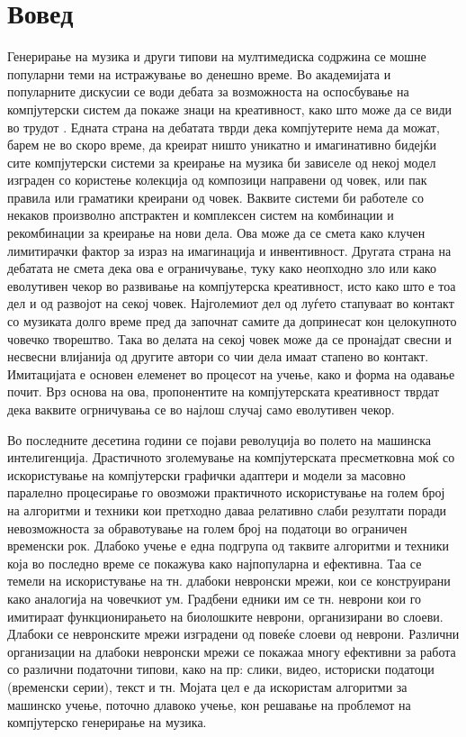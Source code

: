 \chapter{Вовед}

Генерирање на музика и други типови на мултимедиска содржина се мошне популарни теми на истражување во денешно време. Во академијата и популарните дискусии се води дебата за возможноста на оспосбување на компјутерски систем да покаже знаци на креативност, како што може да се види во трудот \cite{Ghedini2015}. Едната страна на дебатата тврди дека компјутерите нема да можат, барем не во скоро време, да креират ништо уникатно и имагинативно бидејќи сите компјутерски системи за креирање на музика би зависеле од некој модел изграден со користење колекција од композици направени од човек, или пак правила или граматики креирани од човек. Ваквите системи би работеле со некаков произволно апстрактен и комплексен систем на комбинации и рекомбинации за креирање на нови дела. Ова може да се смета како клучен лимитирачки фактор за израз на имагинација и инвентивност. Другата страна на дебатата не смета дека ова е ограничување, туку како неопходно зло или како еволутивен чекор во развивање на компјутерска креативност, исто како што е тоа дел и од развојот на секој човек. Најголемиот дел од луѓето стапуваат во контакт со музиката долго време пред да започнат самите да допринесат кон целокупното човечко творештво. Така во делата на секој човек може да се пронајдат свесни и несвесни влијанија од другите автори со чии дела имаат стапено во контакт. Имитацијата е основен елеменет во процесот на учење, како и форма на одавање почит. Врз основа на ова, пропонентите на компјутерската креативност тврдат дека ваквите огрничувања се во најлош случај само еволутивен чекор.

Во последните десетина години се појави револуција во полето на машинска интелигенција. Драстичното зголемување на компјутерската пресметковна моќ со искористување на компјутерски графички адаптери и модели за масовно паралелно процесирање го овозможи практичното искористување на голем број на алгоритми и техники кои претходно даваа релативно слаби резултати поради невозможноста за обравотување на голем број на податоци во ограничен временски рок. Длабоко учење е една подгрупа од таквите алгоритми и техники која во последно време се покажува како најпопуларна и ефективна. Таа се темели на искористување на тн. длабоки невронски мрежи, кои се конструирани како аналогија на човечкиот ум. Градбени едники им се тн. неврони кои го имитираат функционирањето на биолошките неврони, организирани во слоеви. Длабоки се невронските мрежи изградени од повеќе слоеви од неврони. Различни организации на длабоки невронски мрежи се покажаа многу ефективни за работа со различни податочни типови, како на пр: слики, видео, историски податоци (временски серии), текст и тн. Мојата цел е да искористам алгоритми за машинско учење, поточно длавоко учење, кон решавање на проблемот на компјутерско генерирање на музика.

